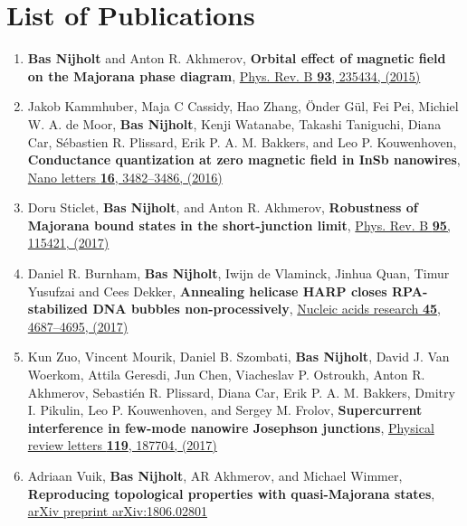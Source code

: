 \chapter*{List of Publications}
\label{publications}

\begin{enumerate}

\item \textbf{Bas Nijholt} and Anton R. Akhmerov, \textbf{Orbital effect of magnetic field on the Majorana phase diagram}, \href{}{Phys. Rev. B \textbf{93}, 235434, (2015)}

\item Jakob Kammhuber, Maja C Cassidy, Hao Zhang, {\"O}nder G{\"u}l, Fei Pei, Michiel W. A. de Moor, \textbf{Bas Nijholt}, Kenji Watanabe, Takashi Taniguchi, Diana Car, S{\'e}bastien R. Plissard, Erik P. A. M. Bakkers, and Leo P. Kouwenhoven, \textbf{Conductance quantization at zero magnetic field in InSb nanowires}, \href{}{Nano letters \textbf{16}, 3482--3486, (2016)}

\item Doru Sticlet, \textbf{Bas Nijholt}, and Anton R. Akhmerov, \textbf{Robustness of Majorana bound states in the short-junction limit}, \href{}{Phys. Rev. B \textbf{95}, 115421, (2017)}

\item Daniel R. Burnham, \textbf{Bas Nijholt}, Iwijn de Vlaminck,  Jinhua Quan, Timur Yusufzai and Cees Dekker, \textbf{Annealing helicase HARP closes RPA-stabilized DNA bubbles non-processively}, \href{}{Nucleic acids research \textbf{45}, 4687--4695, (2017)}

\item Kun Zuo, Vincent Mourik, Daniel B. Szombati, \textbf{Bas Nijholt}, David J. Van Woerkom, Attila Geresdi, Jun Chen, Viacheslav P. Ostroukh, Anton R. Akhmerov, Sebasti{\'e}n R. Plissard, Diana Car, Erik P. A. M. Bakkers, Dmitry I. Pikulin, Leo P. Kouwenhoven, and Sergey M. Frolov, \textbf{Supercurrent interference in few-mode nanowire Josephson junctions}, \href{}{Physical review letters \textbf{119}, 187704, (2017)}

\item Adriaan Vuik, \textbf{Bas Nijholt}, AR Akhmerov, and Michael Wimmer, \textbf{Reproducing topological properties with quasi-Majorana states}, \href{}{arXiv preprint arXiv:1806.02801}


\end{enumerate}
